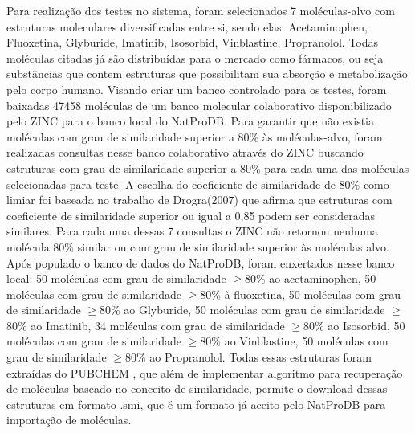 Para realização dos testes no sistema, foram selecionados 7 moléculas-alvo  com estruturas moleculares diversificadas entre si, sendo elas: Acetaminophen, Fluoxetina, Glyburide, Imatinib, Isosorbid, Vinblastine, Propranolol. Todas moléculas citadas já são distribuídas para o mercado como fármacos, ou seja substâncias que contem estruturas que possibilitam sua absorção e metabolização pelo corpo humano. Visando criar um banco controlado para os testes, foram baixadas 47458 moléculas de um banco molecular colaborativo disponibilizado pelo ZINC \cite{irwin2005zinc} para o banco local do NatProDB. Para garantir que não existia moléculas com grau de similaridade superior a 80\% às moléculas-alvo, foram realizadas consultas nesse banco colaborativo através do ZINC buscando estruturas com grau de similaridade superior a 80\% para cada uma das moléculas selecionadas para teste. A escolha do coeficiente de similaridade de 80\% como limiar foi baseada no trabalho de Drogra(2007) que afirma que estruturas com coeficiente de similaridade superior ou igual a 0,85 podem ser consideradas similares. Para cada uma dessas 7 consultas o ZINC não retornou nenhuma molécula 80\% similar ou com grau de similaridade superior às moléculas alvo. Após populado o banco de dados do NatProDB, foram enxertados nesse banco local: 50 moléculas com grau de similaridade $\geq $80\% ao acetaminophen, 50 moléculas com grau de similaridade $\geq $80\% à fluoxetina, 50 moléculas com grau de similaridade $\geq $80\% ao Glyburide, 50 moléculas com grau de similaridade $\geq $80\% ao Imatinib, 34 moléculas com grau de similaridade $\geq $80\% ao Isosorbid, 50 moléculas com grau de similaridade $\geq $80\% ao Vinblastine, 50 moléculas com grau de similaridade $\geq $80\% ao Propranolol. Todas essas estruturas foram extraídas do PUBCHEM \cite{li2010pubchem}, que além de implementar algoritmo para recuperação de moléculas baseado no conceito de similaridade, permite o download dessas estruturas em formato .smi, que é um formato já aceito pelo NatProDB para importação de moléculas.

